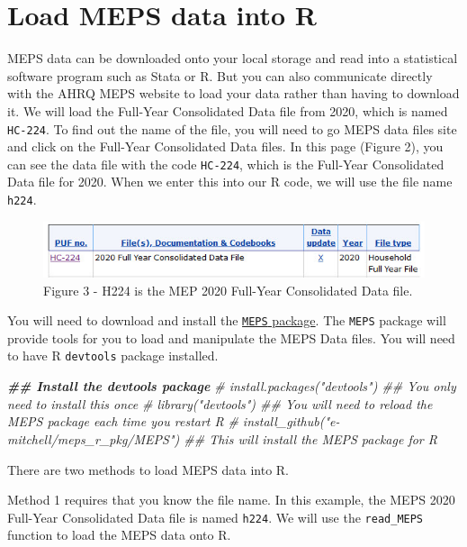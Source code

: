 \documentclass[
]{book}
\newenvironment{Shaded}{\begin{snugshade}}{\end{snugshade}}
\newcommand{\CommentTok}[1]{\textcolor[rgb]{0.56,0.35,0.01}{\textit{#1}}}
\newcommand{\DocumentationTok}[1]{\textcolor[rgb]{0.56,0.35,0.01}{\textbf{\textit{#1}}}}
\theoremstyle{definition}
\theoremstyle{definition}
\theoremstyle{definition}
\theoremstyle{definition}
\theoremstyle{remark}
\begin{document}
\hypertarget{load-meps-data-into-r}{%
\section{Load MEPS data into R}\label{load-meps-data-into-r}}

MEPS data can be downloaded onto your local storage and read into a statistical software program such as Stata or R. But you can also communicate directly with the AHRQ MEPS website to load your data rather than having to download it. We will load the Full-Year Consolidated Data file from 2020, which is named \texttt{HC-224}. To find out the name of the file, you will need to go MEPS data files site and click on the Full-Year Consolidated Data files. In this page (Figure 2), you can see the data file with the code \texttt{HC-224}, which is the Full-Year Consolidated Data file for 2020. When we enter this into our R code, we will use the file name \texttt{h224}.

\begin{figure}
\includegraphics[width=1\linewidth]{Figure 3} \caption{Figure 3 - H224 is the MEP 2020 Full-Year Consolidated Data file.}\label{fig:unnamed-chunk-4}
\end{figure}

You will need to download and install the \href{https://github.com/e-mitchell/meps_r_pkg}{\texttt{MEPS} package}. The \texttt{MEPS} package will provide tools for you to load and manipulate the MEPS Data files. You will need to have R \texttt{devtools} package installed.

\begin{Shaded}
\begin{Highlighting}[]
\DocumentationTok{\#\# Install the devtools package}
\CommentTok{\# install.packages("devtools") \#\# You only need to install this once}
\CommentTok{\# library("devtools")  \#\# You will need to reload the MEPS package each time you restart R}
\CommentTok{\# install\_github("e{-}mitchell/meps\_r\_pkg/MEPS") \#\# This will install the MEPS package for R}
\end{Highlighting}
\end{Shaded}

There are two methods to load MEPS data into R.

Method 1 requires that you know the file name. In this example, the MEPS 2020 Full-Year Consolidated Data file is named \texttt{h224}. We will use the \texttt{read\_MEPS} function to load the MEPS data onto R.
\end{document}
